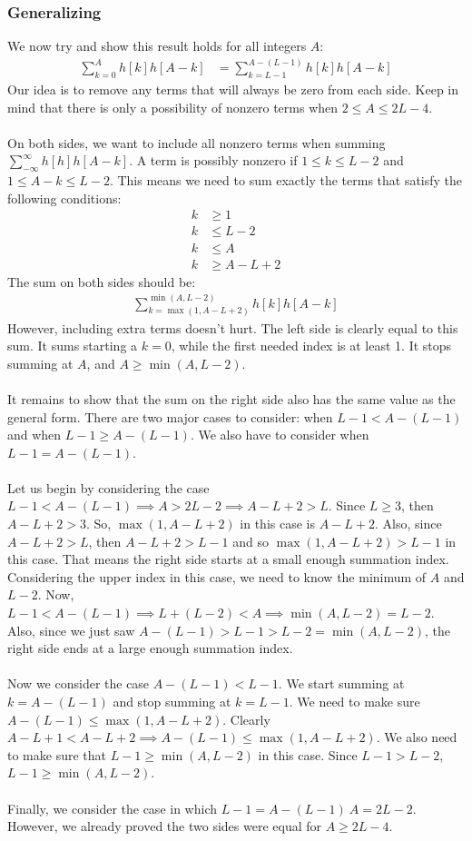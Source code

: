\documentclass[a4paper]{article}
\begin{document}
\subsubsection*{Generalizing}
We now try and show this result holds for all integers $A$:
\begin{align*}
\sum_{k=0}^{A}h[k]h[A-k] &= \sum_{k=L-1}^{A-(L-1)}h[k]h[A-k]
\end{align*}
Our idea is to remove any terms that will always be zero from each side. Keep in mind that there is only a possibility of nonzero terms when $2 \leq A \leq 2L -4$.
\\\\
On both sides, we want to include all nonzero terms when summing $\sum_{-\infty}^{\infty}h[h]h[A-k]$. A term is possibly nonzero if $1 \leq k \leq L - 2$ and $1 \leq A - k \leq L -2$. This means we need to sum exactly the terms that satisfy the following conditions:
\begin{align*}
k &\geq 1 \\
k &\leq L-2 \\
k &\leq A \\
k &\geq A - L + 2
\end{align*}
The sum on both sides should be:
\begin{align*}
\sum_{k=\max(1,A-L+2)}^{\min(A,L-2)}h[k]h[A-k] 
\end{align*}
However, including extra terms doesn't hurt. The left side is clearly equal to this sum. It sums starting a $k = 0$, while the first needed index is at least 1. It stops summing at $A$, and $A \geq \min(A,L-2)$.
\\\\
It remains to show that the sum on the right side also has the same value as the general form. There are two major cases to consider: when $L-1 < A-(L-1)$ and when $L - 1 \geq  A-(L-1)$.  We also have to consider when $L -1 = A-(L-1)$.
\\\\
Let us begin by considering the case $L-1 < A -(L-1) \implies A > 2L - 2 \implies A - L +2 > L$. Since $L \geq 3$, then $A - L + 2 > 3$. So, $\max(1,A-L+2)$ in this case is $A-L+2$. Also, since $A-L+2 > L$, then $A-L+2 > L -1$ and so $\max(1,A-L+2) > L - 1$ in this case. That means the right side starts at a small enough summation index. Considering the upper index in this case, we need to know the minimum of $A$ and $L-2$. Now, $L-1 < A -(L-1) \implies L+(L-2) < A \implies \min{(A,L-2)} = L-2$. Also, since we just saw $A-(L-1) > L - 1 > L - 2 = \min{(A,L-2)}$, the right side ends at a large enough summation index.
\\\\
Now we consider the case $A-(L-1) < L - 1$. We start summing at $k = A -(L-1)$ and stop summing at $k = L -1$. We need to make sure $A-(L-1) \leq \max(1,A-L+2)$. Clearly $A-L+1 < A-L+2 \implies A-(L-1) \leq \max(1,A-L+2)$. We also need to make sure that $L-1 \geq \min(A,L-2)$ in this case. Since $L -1 > L - 2$, $L-1 \geq \min(A,L-2)$.
\\\\
Finally, we consider the case in which $L-1 = A-(L-1) \ A = 2L-2$. However, we already proved the two sides were equal for $A \geq 2L-4$.
\clearpage
\end{document}
